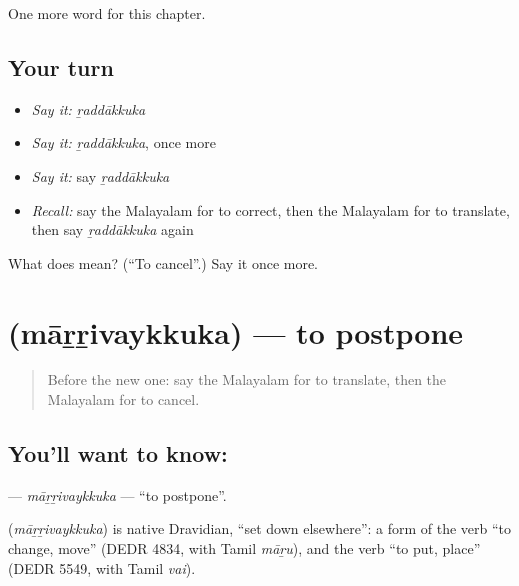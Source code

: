 \begin{grammarlens}[title={What you've built}]
One more word for this chapter.
\end{grammarlens}

\subsection*{Your turn}
\begin{itemize}
\raggedright
  \item \emph{Say it:} \emph{ṟaddākkuka}
  \item \emph{Say it:} \emph{ṟaddākkuka}, once more
  \item \emph{Say it:} say \emph{ṟaddākkuka}
  \item \emph{Recall:} say the Malayalam for to correct, then the Malayalam for to translate, then say \emph{ṟaddākkuka} again
\end{itemize}

\begin{tcolorbox}[breakable,colback=teal!4,colframe=teal!35!black,title={Before you move on}]
What does  mean? (\textquotedblleft{}To cancel\textquotedblright{}.) Say it once more.
\end{tcolorbox}
\section[\texorpdfstring{\ml{മാറ്റിവയ്ക്കുക} (māṟṟivaykkuka)}{മാറ്റിവയ്ക്കുക (māṟṟivaykkuka)}]{ (māṟṟivaykkuka) — to postpone}

\label{lesson:ML-C306-marrivaykkuka}



\begin{quote}
Before the new one: say the Malayalam for to translate, then the Malayalam for to cancel.
\end{quote}

\subsection*{You'll want to know: }
\textbf{} — \emph{māṟṟivaykkuka} — \textquotedblleft{}to postpone\textquotedblright{}.

\begin{cousinweb}
\textbf{} (\emph{māṟṟivaykkuka}) is native Dravidian, \textquotedblleft{}set down elsewhere\textquotedblright{}: a form of the verb \textquotedblleft{}to change, move\textquotedblright{} (DEDR 4834, with Tamil \emph{māṟu}), and the verb \textquotedblleft{}to put, place\textquotedblright{} (DEDR 5549, with Tamil \emph{vai}).
\end{cousinweb}

